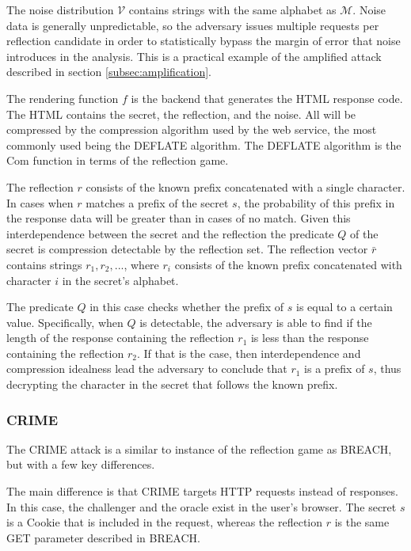 \documentclass[conference, letterpaper, 10pt]{IEEEtran}
\begin{document}
The noise distribution $\mathcal{V}$ contains strings with the same alphabet as
$\mathcal{M}$. Noise data is generally unpredictable, so the adversary issues
multiple requests per reflection candidate in order to statistically bypass the
margin of error that noise introduces in the analysis. This is a practical
example of the amplified attack described in section \ref{subsec:amplification}.

The rendering function $f$ is the backend that generates the HTML response code.
The HTML contains the secret, the reflection, and the noise. All will be
compressed by the compression algorithm used by the web service, the most
commonly used being the DEFLATE algorithm. The DEFLATE algorithm is the
$\textrm{Com}$ function in terms of the reflection game.

The reflection $r$ consists of the known prefix concatenated with a single
character. In cases when $r$ matches a prefix of the secret $s$, the probability
of this prefix in the response data will be greater than in cases of no match.
Given this interdependence between the secret and the reflection the predicate
$Q$ of the secret is compression detectable by the reflection set. The
reflection vector $\bar{r}$ contains strings $r_1, r_2, ...$, where $r_i$
consists of the known prefix concatenated with character $i$ in the secret's
alphabet.

The predicate $Q$ in this case checks whether the prefix of $s$ is equal to a
certain value. Specifically, when $Q$ is detectable, the adversary is able to
find if the length of the response containing the reflection $r_1$ is less than
the response containing the reflection $r_2$. If that is the case, then
interdependence and compression idealness lead the adversary to conclude that
$r_1$ is a prefix of $s$, thus decrypting the character in the secret that
follows the known prefix.

\subsubsection{CRIME}
The CRIME attack is a similar to instance of the reflection game as BREACH, but
with a few key differences.

The main difference is that CRIME targets HTTP requests instead of responses. In
this case, the challenger and the oracle exist in the user's browser. The secret
$s$ is a Cookie that is included in the request, whereas the reflection $r$ is
the same GET parameter described in BREACH.
\end{document}
